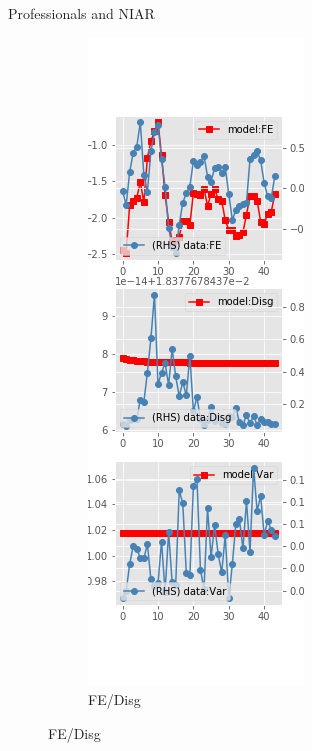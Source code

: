\documentclass{beamer}
\begin{document}
\begin{frame}{Professionals and NIAR}
\begin{figure}[ht]
\begin{subfigure}[b]{0.2\textwidth}
		\end{subfigure}
		\hfill
		\begin{subfigure}[b]{0.2\textwidth}
			\caption{FE/Disg}
			\includegraphics[width=\textwidth, height = 0.8\textheight]{figuresDraft/spf_ni_est_diag2.png}

\end{subfigure}
\end{figure}
\end{frame}
\end{document}
